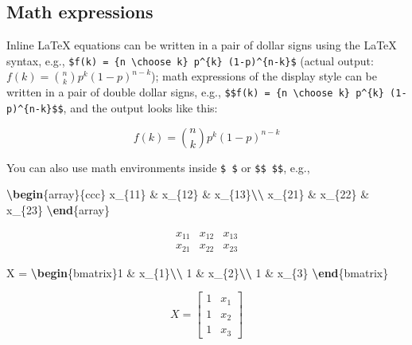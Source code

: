 \documentclass[
  12pt,
]{krantz}
\newenvironment{Shaded}{\begin{snugshade}}{\end{snugshade}}
\newcommand{\ExtensionTok}[1]{#1}
\newcommand{\KeywordTok}[1]{\textcolor[rgb]{0.13,0.29,0.53}{\textbf{#1}}}
\newcommand{\NormalTok}[1]{#1}
\newcommand{\SpecialCharTok}[1]{\textcolor[rgb]{0.81,0.36,0.00}{\textbf{#1}}}
\newcommand{\SpecialStringTok}[1]{\textcolor[rgb]{0.31,0.60,0.02}{#1}}
\theoremstyle{definition}
\theoremstyle{definition}
\theoremstyle{definition}
\theoremstyle{definition}
\theoremstyle{remark}
\begin{document}
\subsection{Math expressions}\label{math-expressions}

Inline LaTeX equations can be written in a pair of dollar signs using the LaTeX syntax, e.g., \texttt{\$f(k)\ =\ \{n\ \textbackslash{}choose\ k\}\ p\^{}\{k\}\ (1-p)\^{}\{n-k\}\$} (actual output: \(f(k)={n \choose k}p^{k}(1-p)^{n-k}\)); math expressions of the display style can be written in a pair of double dollar signs, e.g., \texttt{\$\$f(k)\ =\ \{n\ \textbackslash{}choose\ k\}\ p\^{}\{k\}\ (1-p)\^{}\{n-k\}\$\$}, and the output looks like this:

\[f\left(k\right)=\binom{n}{k}p^k\left(1-p\right)^{n-k}\]

You can also use math environments inside \texttt{\$\ \$} or \texttt{\$\$\ \$\$}, e.g.,

\begin{Shaded}
\begin{Highlighting}[]
\SpecialStringTok{$$}\KeywordTok{\textbackslash{}begin}\NormalTok{\{}\ExtensionTok{array}\NormalTok{\}}\SpecialStringTok{\{ccc\}}
\SpecialStringTok{x\_\{11\} \& x\_\{12\} \& x\_\{13\}}\SpecialCharTok{\textbackslash{}\textbackslash{}}
\SpecialStringTok{x\_\{21\} \& x\_\{22\} \& x\_\{23\}}
\KeywordTok{\textbackslash{}end}\NormalTok{\{}\ExtensionTok{array}\NormalTok{\}}\SpecialStringTok{$$}
\end{Highlighting}
\end{Shaded}

\[\begin{array}{ccc}
x_{11} & x_{12} & x_{13}\\
x_{21} & x_{22} & x_{23}
\end{array}\]

\begin{Shaded}
\begin{Highlighting}[]
\SpecialStringTok{$$X = }\KeywordTok{\textbackslash{}begin}\NormalTok{\{}\ExtensionTok{bmatrix}\NormalTok{\}}\SpecialStringTok{1 \& x\_\{1\}}\SpecialCharTok{\textbackslash{}\textbackslash{}}
\SpecialStringTok{1 \& x\_\{2\}}\SpecialCharTok{\textbackslash{}\textbackslash{}}
\SpecialStringTok{1 \& x\_\{3\}}
\KeywordTok{\textbackslash{}end}\NormalTok{\{}\ExtensionTok{bmatrix}\NormalTok{\}}\SpecialStringTok{$$}
\end{Highlighting}
\end{Shaded}

\[X = \begin{bmatrix}1 & x_{1}\\
1 & x_{2}\\
1 & x_{3}
\end{bmatrix}\]
\end{document}
